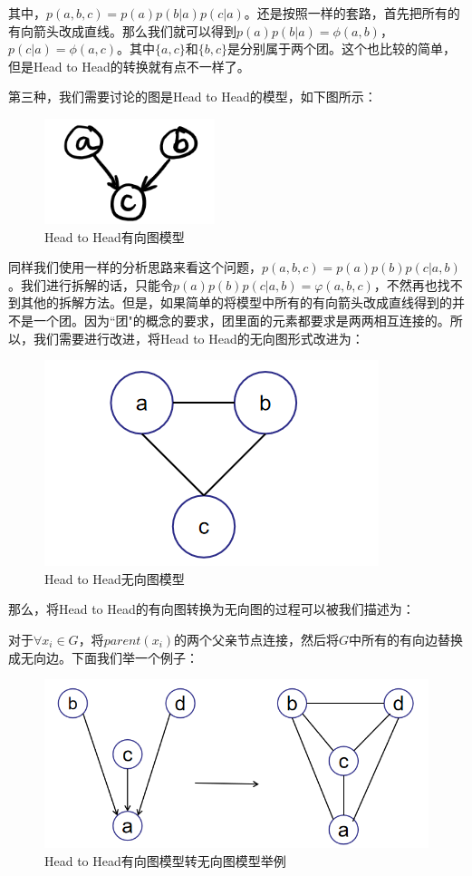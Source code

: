 \documentclass[a4paper]{article}
\begin{document}
其中，$p(a,b,c) = p(a)p(b|a)p(c|a)$。还是按照一样的套路，首先把所有的有向箭头改成直线。那么我们就可以得到$p(a)p(b|a) = \phi(a,b)$，$p(c|a) = \phi(a,c)$。其中$\{a,c\}$和$\{b,c\}$是分别属于两个团。这个也比较的简单，但是Head to Head的转换就有点不一样了。

第三种，我们需要讨论的图是Head to Head的模型，如下图所示：
\begin{figure}[H]
    \centering
    \includegraphics[width=.2\textwidth]{微信图片_20191211153908.png}
    \caption{Head to Head有向图模型}
    \label{fig:my_label_1}
\end{figure}

同样我们使用一样的分析思路来看这个问题，$p(a,b,c) = p(a)p(b)p(c|a,b)$。我们进行拆解的话，只能令$p(a)p(b)p(c|a,b) = \varphi(a,b,c)$，不然再也找不到其他的拆解方法。但是，如果简单的将模型中所有的有向箭头改成直线得到的并不是一个团。因为``团"的概念的要求，团里面的元素都要求是两两相互连接的。所以，我们需要进行改进，将Head to Head的无向图形式改进为：
\begin{figure}[H]
    \centering
    \includegraphics[width=.3\textwidth]{微信图片_20191211155130.png}
    \caption{Head to Head无向图模型}
    \label{fig:my_label_1}
\end{figure}

那么，将Head to Head的有向图转换为无向图的过程可以被我们描述为：

对于$\forall x_i \in G$，将$parent(x_i)$的两个父亲节点连接，然后将$G$中所有的有向边替换成无向边。下面我们举一个例子：
\begin{figure}[H]
    \centering
    \includegraphics[width=.5\textwidth]{微信图片_20191211160601.png}
    \caption{Head to Head有向图模型转无向图模型举例}
    \label{fig:my_label_1}
\end{figure}
\end{document}
